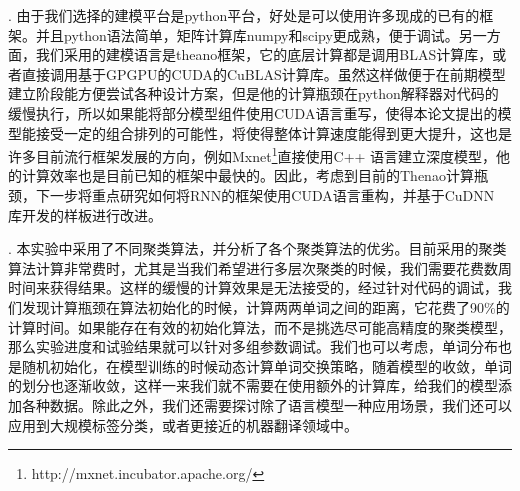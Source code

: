. 由于我们选择的建模平台是python平台，好处是可以使用许多现成的已有的框架。并且python语法简单，矩阵计算库numpy和scipy更成熟，便于调试。另一方面，我们采用的建模语言是theano框架，它的底层计算都是调用BLAS计算库，或者直接调用基于GPGPU的CUDA的CuBLAS计算库。虽然这样做便于在前期模型建立阶段能方便尝试各种设计方案，但是他的计算瓶颈在python解释器对代码的缓慢执行，所以如果能将部分模型组件使用CUDA语言重写，使得本论文提出的模型能接受一定的组合排列的可能性，将使得整体计算速度能得到更大提升，这也是许多目前流行框架发展的方向，例如Mxnet\footnote{http://mxnet.incubator.apache.org/}直接使用C++ 语言建立深度模型，他的计算效率也是目前已知的框架中最快的。因此，考虑到目前的Thenao计算瓶颈，下一步将重点研究如何将RNN的框架使用CUDA语言重构，并基于CuDNN 库开发的样板进行改进。


. 本实验中采用了不同聚类算法，并分析了各个聚类算法的优劣。目前采用的聚类算法计算非常费时，尤其是当我们希望进行多层次聚类的时候，我们需要花费数周时间来获得结果。这样的缓慢的计算效果是无法接受的，经过针对代码的调试，我们发现计算瓶颈在算法初始化的时候，计算两两单词之间的距离，它花费了90\%的计算时间。如果能存在有效的初始化算法，而不是挑选尽可能高精度的聚类模型，那么实验进度和试验结果就可以针对多组参数调试。我们也可以考虑，单词分布也是随机初始化，在模型训练的时候动态计算单词交换策略，随着模型的收敛，单词的划分也逐渐收敛，这样一来我们就不需要在使用额外的计算库，给我们的模型添加各种数据。除此之外，我们还需要探讨除了语言模型一种应用场景，我们还可以应用到大规模标签分类，或者更接近的机器翻译领域中。

